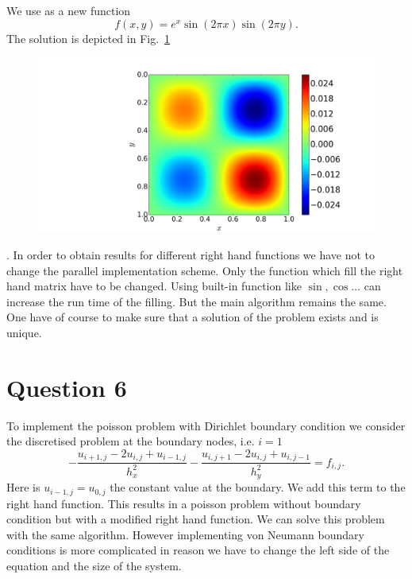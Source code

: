 We use as a new function
\begin{equation}
	f(x, y) = e^x \sin(2\pi x)\sin(2\pi y).
\end{equation}
The solution is depicted in Fig.~\ref{fig:func_plot}\begin{figure}[h] 
  \centering
     \includegraphics[width=\textwidth]{pic/func_plot.png}
  \caption{}
  \label{fig:func_plot}
\end{figure}. In order to obtain results for different right hand functions we have not to change the parallel implementation scheme. Only the function which fill the right hand matrix have to be changed. Using built-in function like $\sin, \cos \ldots$ can increase the run time of the filling. But the main algorithm remains the same. One have of course to make sure that a solution of the problem exists and is unique.  

\section*{Question 6}

To implement the poisson problem with Dirichlet boundary condition we consider the discretised problem at the boundary nodes, i.e. $i = 1$
\begin{equation}
	-\frac{u_{i+1, j} - 2u_{i, j} + u_{i-1, j}}{h_x^2}  -\frac{u_{i, j+1} - 2u_{i, j} + u_{i, j-1}}{h_y^2} = f_{i,j}.
\end{equation}
Here is $u_{i-1, j} = u_{0, j}$ the constant value at the boundary. We add this term to the right hand function. This results in a poisson problem without boundary condition but with a modified right hand function. We can solve this problem with the same algorithm. However implementing von Neumann boundary conditions is more complicated in reason we have to change the left side of the equation and the size of the system.

